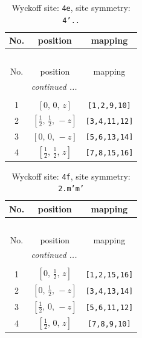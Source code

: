 \documentclass[fleqn,8pt]{jsarticle}
\begin{document}
\begin{longtable}{ccc}
\caption{Wyckoff site: {\tt 4e}, site symmetry: {\tt 4'..}}
 \\
 \hline \hline
No. & position & mapping \\ \hline \endfirsthead

\multicolumn{2}{l}{\tablename\ \thetable{}} \\
 \hline \hline
No. & position & mapping \\ \hline \endhead

 \hline \hline
\multicolumn{2}{r}{\footnotesize\it continued ...} \\ \endfoot

 \hline \hline
\multicolumn{2}{r}{} \\ \endlastfoot

1 & $\left[ 0,\, 0,\, z \right]$ & {\tt [1,2,9,10]} \\ \hline
2 & $\left[ \frac{1}{2},\, \frac{1}{2},\, - z \right]$ & {\tt [3,4,11,12]} \\ \hline
3 & $\left[ 0,\, 0,\, - z \right]$ & {\tt [5,6,13,14]} \\ \hline
4 & $\left[ \frac{1}{2},\, \frac{1}{2},\, z \right]$ & {\tt [7,8,15,16]} \\
\end{longtable}
\renewcommand{\arraystretch}{1.2}
\begin{longtable}{ccc}
\caption{Wyckoff site: {\tt 4f}, site symmetry: {\tt 2.m'm'}}
 \\
 \hline \hline
No. & position & mapping \\ \hline \endfirsthead

\multicolumn{2}{l}{\tablename\ \thetable{}} \\
 \hline \hline
No. & position & mapping \\ \hline \endhead

 \hline \hline
\multicolumn{2}{r}{\footnotesize\it continued ...} \\ \endfoot

 \hline \hline
\multicolumn{2}{r}{} \\ \endlastfoot

1 & $\left[ 0,\, \frac{1}{2},\, z \right]$ & {\tt [1,2,15,16]} \\ \hline
2 & $\left[ 0,\, \frac{1}{2},\, - z \right]$ & {\tt [3,4,13,14]} \\ \hline
3 & $\left[ \frac{1}{2},\, 0,\, - z \right]$ & {\tt [5,6,11,12]} \\ \hline
4 & $\left[ \frac{1}{2},\, 0,\, z \right]$ & {\tt [7,8,9,10]} \\
\end{longtable}
\end{document}
